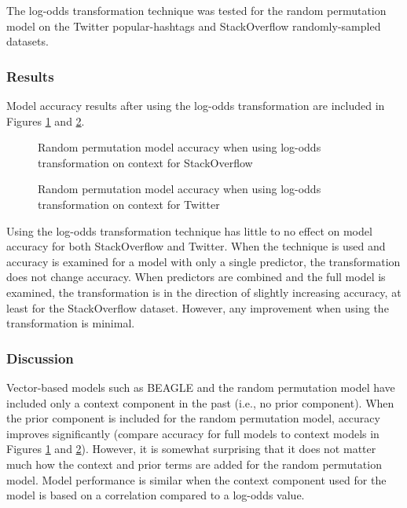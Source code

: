 \documentclass[man,floatsintext,donotrepeattitle]{apa6}
\begin{document}
The log-odds transformation technique was tested for the random permutation model on the Twitter popular-hashtags and StackOverflow randomly-sampled datasets.

\subsubsection{Results}

Model accuracy results after using the log-odds transformation are included in Figures \ref{figContextLogoddsSO} and \ref{figContextLogoddsT}.

\begin{figure}[!htbp]
  \caption{Random permutation model accuracy when using log-odds transformation on context for StackOverflow}
  \label{figContextLogoddsSO}
\end{figure}

\begin{figure}[!htbp]
  \caption{Random permutation model accuracy when using log-odds transformation on context for Twitter}
  \label{figContextLogoddsT}
\end{figure}

Using the log-odds transformation technique has little to no effect on model accuracy for both StackOverflow and Twitter.
When the technique is used and accuracy is examined for a model with only a single predictor, the transformation does not change accuracy.
When predictors are combined and the full model is examined, the transformation is in the direction of slightly increasing accuracy, at least for the StackOverflow dataset.
However, any improvement when using the transformation is minimal.

\subsubsection{Discussion}

Vector-based models such as BEAGLE \parencite{Jones2007} and the random permutation model \parencite{Sahlgren2008} have included only a context component in the past (i.e., no prior component).
When the prior component is included for the random permutation model, accuracy improves significantly (compare accuracy for full models to context models in Figures \ref{figContextLogoddsSO} and \ref{figContextLogoddsT}).
However, it is somewhat surprising that it does not matter much how the context and prior terms are added for the random permutation model.
Model performance is similar when the context component used for the model is based on a correlation compared to a log-odds value.
\end{document}
